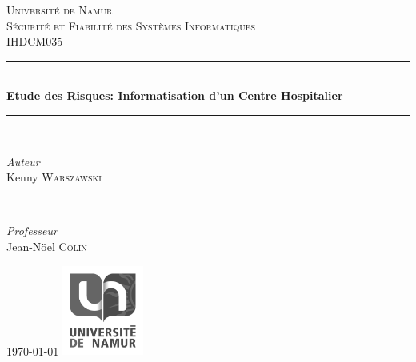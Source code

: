 \documentclass[12pt]{article}
\begin{document}
\begin{titlepage}
	\newcommand{\HRule}{\rule{\linewidth}{0.5mm}}
	\center
	\textsc{\LARGE Université de Namur}\\[1.5cm]
	\textsc{\Large Sécurité et Fiabilité des Systèmes Informatiques }\\[0.5cm]
	\textsc{\large IHDCM035}\\[0.5cm]
	\HRule\\[0.4cm]
	{\huge\bfseries Etude des Risques: Informatisation d'un Centre Hospitalier}\\[0.4cm]
	\HRule\\[1.5cm]	
	\begin{minipage}{0.4\textwidth}
		\begin{flushleft}
			\large
			\textit{Auteur}\\
			Kenny \textsc{Warszawski} 
		\end{flushleft}
	\end{minipage}
	~
	\begin{minipage}{0.4\textwidth}
		\begin{flushright}
			\large
			\textit{Professeur}\\
			Jean-Nöel \textsc{Colin} 
		\end{flushright}
	\end{minipage}	
	\vfill\vfill\vfill
	{\large\today}
	\vfill\vfill
	\includegraphics[width=0.2\textwidth]{assets/placeholder.png}\\[1cm]
	\vfill
\end{titlepage}
\end{document}

